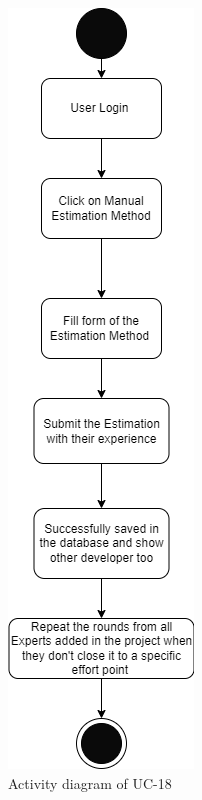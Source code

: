 \begin{figure}[H]
    \centering
    \includegraphics[scale=0.5]{./diagrams/Activity Diagram/ad-18.png}
    \caption{Activity diagram of UC-18}
    \label{fig:act-18}

\end{figure}


